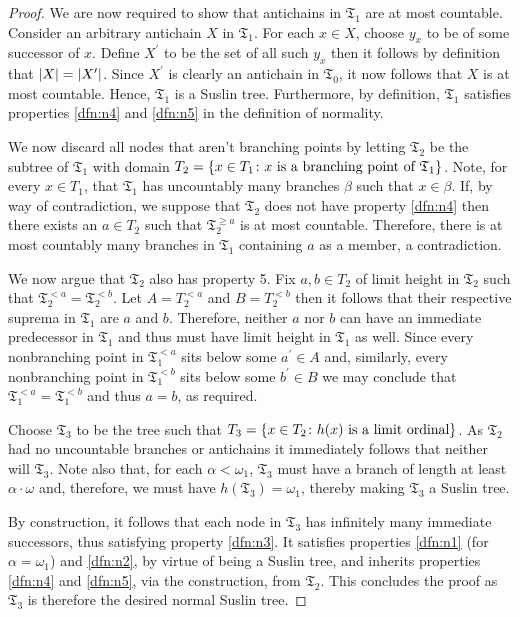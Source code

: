 \begin{proof}
	We are now required to show that antichains in $\mathfrak{T}_1$ are at most
	countable.  Consider an arbitrary antichain $X$ in $\mathfrak{T}_1$.  For each $x\in X$,
	choose $y_{x}$ to be of some successor of $x$.  Define $X^{\prime}$
	to be the set of all such $y_{x}$ then it follows by definition that
	$\left\lvert X\right\rvert=\left\lvert X^{\prime}\right\rvert$. Since $X^{\prime}$ is clearly an antichain in
	$\mathfrak{T}_{0}$, it now follows that $X$ is at most countable.  Hence,
	$\mathfrak{T}_{1}$ is a Suslin tree. Furthermore, by definition,
	$\mathfrak{T}_1$ satisfies properties \ref{dfn:n4} and \ref{dfn:n5} in the
	definition of normality.

	We now discard all nodes that aren't branching points by letting
	$\mathfrak{T}_2$ be the subtree of $\mathfrak{T}_{1}$ with domain
	$T_2=\left\lbrace x\in T_1\colon x\text{ is a branching point of }\mathfrak{T}_1 \right\rbrace$.
    Note, for every $x\in T_1$, that $\mathfrak{T}_1$ has uncountably many
    branches $\beta$ such that $x\in\beta$.  If, by way of contradiction, we
    suppose that $\mathfrak{T}_2$ does not have property \ref{dfn:n4} then there
    exists an $a\in T_2$ such that $\mathfrak{T}_2^{\geq a}$ is at most
    countable.  Therefore, there is at most countably many branches in
    $\mathfrak{T}_1$ containing $a$ as a member, a contradiction.

    We now argue that $\mathfrak{T}_2$ also has property 5.  Fix $a,b\in T_2$ of
    limit height in $\mathfrak{T}_2$ such that
    $\mathfrak{T}_2^{<a}=\mathfrak{T}_2^{<b}$.  Let $A=T_2^{<a}$ and
    $B=T_2^{<b}$ then it follows that their respective suprema in
    $\mathfrak{T}_1$ are $a$ and $b$.  Therefore, neither $a$ nor $b$ can have
    an immediate predecessor in $\mathfrak{T}_1$ and thus must have limit height
    in $\mathfrak{T}_1$ as well.  Since every nonbranching point in
    $\mathfrak{T}_1^{<a}$ sits below some $a^\prime\in A$ and, similarly, every
    nonbranching point in $\mathfrak{T}_1^{<b}$ sits below some $b^\prime\in B$
    we may conclude that $\mathfrak{T}_1^{<a}=\mathfrak{T}_1^{<b}$ and thus
    $a=b$, as required.

    Choose $\mathfrak{T}_3$ to be the tree such that $T_3=\left\lbrace x\in
    T_2\colon h(x)\text{ is a limit ordinal} \right\rbrace$. As $\mathfrak{T}_2$ had no
    uncountable branches or antichains it immediately follows that neither will
    $\mathfrak{T}_3$.  Note also that, for each $\alpha<\omega_{1}$,
    $\mathfrak{T}_{3}$ must have a branch of length at least $\alpha\cdot\omega$
    and, therefore, we must have $h(\mathfrak{T}_{3})=\omega_{1}$, thereby
    making $\mathfrak{T}_3$ a Suslin tree.

	By construction, it follows that each node in $\mathfrak{T}_3$ has
	infinitely many immediate successors, thus satisfying property \ref{dfn:n3}.
	It satisfies properties \ref{dfn:n1} (for $\alpha=\omega_1$) and \ref{dfn:n2},
	by virtue of being a Suslin tree, and inherits properties \ref{dfn:n4} and
    \ref{dfn:n5}, via the construction, from $\mathfrak{T}_2$.  This concludes
    the proof as $\mathfrak{T}_3$ is therefore the desired normal Suslin tree.
\end{proof}

